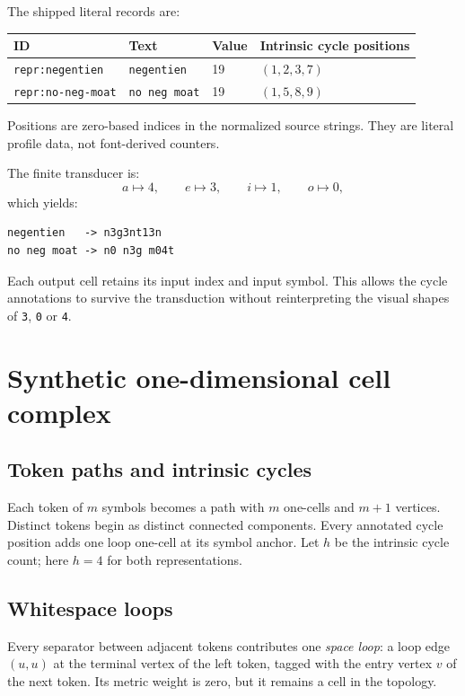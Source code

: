 \documentclass[10pt,a4paper]{article}
\newcommand{\code}[1]{\texttt{#1}}
\begin{document}
The shipped literal records are:
\begin{center}
\begin{tabularx}{0.95\textwidth}{lXll}
\toprule
\textbf{ID} & \textbf{Text} & \textbf{Value} & \textbf{Intrinsic cycle positions}\\
\midrule
\code{repr:negentien} & \code{negentien} & 19 & $(1,2,3,7)$\\
\code{repr:no-neg-moat} & \code{no neg moat} & 19 & $(1,5,8,9)$\\
\bottomrule
\end{tabularx}
\end{center}
Positions are zero-based indices in the normalized source strings. They are literal profile data, not font-derived counters.

The finite transducer is:
\[
a\mapsto4,\qquad e\mapsto3,\qquad i\mapsto1,\qquad o\mapsto0,
\]
which yields:
\begin{Verbatim}[fontsize=\small]
negentien   -> n3g3nt13n
no neg moat -> n0 n3g m04t
\end{Verbatim}
Each output cell retains its input index and input symbol. This allows the cycle annotations to survive the transduction without reinterpreting the visual shapes of \code{3}, \code{0} or \code{4}.

\section{Synthetic one-dimensional cell complex}

\subsection{Token paths and intrinsic cycles}
Each token of $m$ symbols becomes a path with $m$ one-cells and $m+1$ vertices. Distinct tokens begin as distinct connected components. Every annotated cycle position adds one loop one-cell at its symbol anchor. Let $h$ be the intrinsic cycle count; here $h=4$ for both representations.

\subsection{Whitespace loops}
Every separator between adjacent tokens contributes one \emph{space loop}: a loop edge $(u,u)$ at the terminal vertex of the left token, tagged with the entry vertex $v$ of the next token. Its metric weight is zero, but it remains a cell in the topology.
\end{document}
